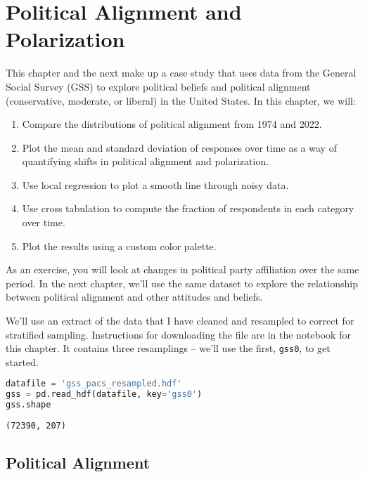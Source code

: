 \chapter{Political Alignment and
Polarization}\label{political-alignment-and-polarization}

This chapter and the next make up a case study that uses data from the
General Social Survey (GSS) to explore political beliefs and political
alignment (conservative, moderate, or liberal) in the United States. In
this chapter, we will:

\begin{enumerate}
\def\labelenumi{\arabic{enumi}.}
\item
  Compare the distributions of political alignment from 1974 and 2022.
\item
  Plot the mean and standard deviation of responses over time as a way
  of quantifying shifts in political alignment and polarization.
\item
  Use local regression to plot a smooth line through noisy data.
\item
  Use cross tabulation to compute the fraction of respondents in each
  category over time.
\item
  Plot the results using a custom color palette.
\end{enumerate}

As an exercise, you will look at changes in political party affiliation
over the same period. In the next chapter, we'll use the same dataset to
explore the relationship between political alignment and other attitudes
and beliefs.

We'll use an extract of the data that I have cleaned and resampled to
correct for stratified sampling. Instructions for downloading the file
are in the notebook for this chapter. It contains three resamplings --
we'll use the first, \passthrough{\lstinline!gss0!}, to get started.

\begin{lstlisting}[language=Python,style=source]
datafile = 'gss_pacs_resampled.hdf'
gss = pd.read_hdf(datafile, key='gss0')
gss.shape
\end{lstlisting}

\begin{lstlisting}[style=output]
(72390, 207)
\end{lstlisting}

\section{Political Alignment}\label{political-alignment}

